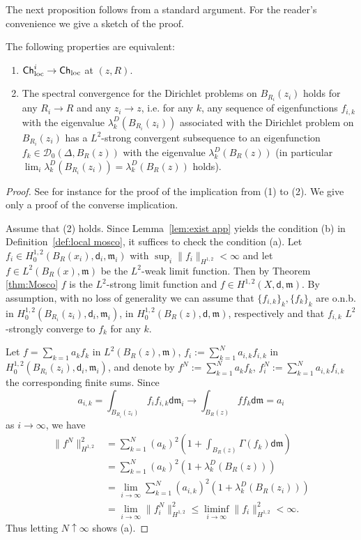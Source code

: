 \documentclass[a4paper,11pt,reqno]{article}
\numberwithin{equation}{section}
\theoremstyle{plain}
\theoremstyle{definition}
\theoremstyle{remark}
\newcommand{\Ch}{{\sf Ch}}
\newcommand{\dist}{\mathsf{d}}
\newcommand{\meas}{\mathfrak{m}}
\begin{document}
{The next proposition follows from a standard argument. For the reader's convenience we give a sketch of the proof.

\begin{proposition}\label{prop:equiv}
The following properties are equivalent:
\begin{enumerate}
\item[(1)] $\Ch^i_{\mathrm{loc}} \to \Ch_{\mathrm{loc}}$ at $(z, R)$.
\item[(2)] The spectral convergence for the Dirichlet problems on $B_{R_i}(z_i)$ holds for any $R_i \to R$ and any $z_i \to z$, i.e. for any $k$, any sequence of eigenfunctions $f_{i, k}$ with the eigenvalue $\lambda_k^D(B_{R_i}(z_i))$ associated with the Dirichlet problem on $B_{R_i}(z_i)$ has a $L^2$-strong convergent subsequence to an eigenfunction $f_k \in \mathcal{D}_0(\Delta, B_R(z))$ with the eigenvalue $\lambda_k^D(B_R(z))$ (in particular $\lim_i\lambda_k^D(B_{R_i}(z_i))=\lambda_k^D(B_R(z))$ holds). 
\end{enumerate}
\end{proposition}
\begin{proof}
See for instance \cite[Theorem 7.8]{GigliMondinoSavare13} for the proof of the implication from (1) to (2).
We give only a proof of the converse implication.

Assume that (2) holds. 
Since Lemma~\ref{lem:exist app} yields the condition (b) in Definition~\ref{def:local mosco}, it suffices to check the condition (a).
Let $f_i \in H^{1, 2}_0(B_R(x_i), \dist_i, \meas_i)$ with $\sup_i\|f_i\|_{H^{1, 2}}<\infty$ and let $f \in L^2(B_R(x), \meas)$ be the $L^2$-weak limit function.
Then by Theorem \ref{thm:Mosco} $f$ is the $L^2$-strong limit function and $f \in H^{1, 2}(X, \dist, \meas)$.
By assumption, with no loss of generality we can assume that $\{f_{i, k}\}_k, \{f_k\}_k$ are o.n.b. in 
$H^{1, 2}_0(B_{R_i}(z_i), \dist_i, \meas_i)$, in $H^{1, 2}_0(B_R(z), \dist, \meas)$, respectively and that 
$f_{i, k}$ $L^2$-strongly converge to $f_k$ for any $k$. 

Let $f=\sum_{k=1}a_kf_k$ in $L^2(B_R(z), \meas)$, $f_i:=\sum_{k=1}^Na_{i, k}f_{i, k}$ in $H^{1, 2}_0(B_{R_i}(z_i), \dist_i, \meas_i)$, 
and denote by $f^N:=\sum_{k=1}^Na_kf_k$, $f_i^N:=\sum_{k=1}^Na_{i, k}f_{i, k}$ the corresponding finite sums.
Since 
$$a_{i, k}=\int_{B_{R_i}(z_i)}f_i f_{i, k}\dist \meas_i \to \int_{B_R(z)}f f_k\dist \meas=a_i$$
as $i \to \infty$, we have
\begin{align*}
\|f^N\|_{H^{1, 2}}^2&= \sum_{k=1}^N(a_k)^2\left(1 + \int_{B_R(z)} \Gamma (f_k) \dist \meas \right) \\
&=\sum_{k=1}^N(a_k)^2(1+\lambda_k^{D}(B_R(z))) \\
&=\lim_{i \to \infty}\sum_{k=1}^N(a_{i, k})^2(1+\lambda_k^{D}(B_R(z_i)))\\
&=\lim_{i \to \infty}\|f_i^N\|_{H^{1, 2}}^2 \le \liminf_{i \to \infty}\|f_i\|_{H^{1, 2}}^2<\infty.
\end{align*}
Thus letting $N \uparrow \infty$ shows (a).
\end{proof}

}
\end{document}
